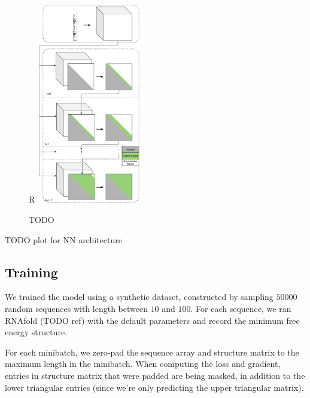\documentclass{article}
\begin{document}
%

\begin{figure}{R}
        \centering
        \includegraphics[width=0.4\textwidth]{plot/nn_arch_2.pdf}
        \caption{TODO}
        \label{fig:nn_arch_2}
        \centering
\end{figure}


TODO plot for NN architecture


\subsection{Training}

We trained the model using a synthetic dataset, constructed by sampling $50000$ random sequences with length
between $10$ and $100$.
For each sequence, we ran RNAfold (TODO ref) with the default parameters and
record the minimum free energy structure.

For each minibatch, we zero-pad the sequence array and structure matrix to the maximum length in the minibatch.
When computing the loss and gradient, entries in structure matrix that were padded are being masked,
in addition to the lower triangular entries (since we're only predicting the upper triangular matrix).
\end{document}
